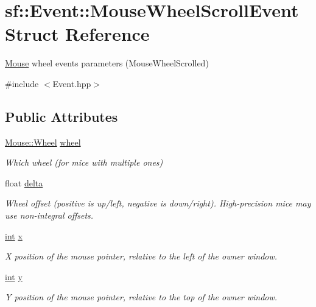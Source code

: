 \hypertarget{structsf_1_1_event_1_1_mouse_wheel_scroll_event}{\section{sf\-:\-:Event\-:\-:Mouse\-Wheel\-Scroll\-Event Struct Reference}
\label{structsf_1_1_event_1_1_mouse_wheel_scroll_event}
}


\hyperlink{classsf_1_1_mouse}{Mouse} wheel events parameters (Mouse\-Wheel\-Scrolled)  




{\ttfamily \#include $<$Event.\-hpp$>$}

\subsection*{Public Attributes}
\begin{DoxyCompactItemize}
\item 
\hyperlink{classsf_1_1_mouse_a60dd479a43f26f200e7957aa11803ff4}{Mouse\-::\-Wheel} \hyperlink{structsf_1_1_event_1_1_mouse_wheel_scroll_event_a1d82dccecc46968d517b2fc66639dd74}{wheel}
\begin{DoxyCompactList}\small\item\em Which wheel (for mice with multiple ones) \end{DoxyCompactList}\item 
float \hyperlink{structsf_1_1_event_1_1_mouse_wheel_scroll_event_ac45c164997a594d424071e74b53b5817}{delta}
\begin{DoxyCompactList}\small\item\em Wheel offset (positive is up/left, negative is down/right). High-\/precision mice may use non-\/integral offsets. \end{DoxyCompactList}\item 
\hyperlink{term__entry_8h_ad65b480f8c8270356b45a9890f6499ae}{int} \hyperlink{structsf_1_1_event_1_1_mouse_wheel_scroll_event_a3d17cae0568d18083f879655abdc8ae4}{x}
\begin{DoxyCompactList}\small\item\em X position of the mouse pointer, relative to the left of the owner window. \end{DoxyCompactList}\item 
\hyperlink{term__entry_8h_ad65b480f8c8270356b45a9890f6499ae}{int} \hyperlink{structsf_1_1_event_1_1_mouse_wheel_scroll_event_aa38bf23704162024eed19917eef3853c}{y}
\begin{DoxyCompactList}\small\item\em Y position of the mouse pointer, relative to the top of the owner window. \end{DoxyCompactList}\end{DoxyCompactItemize}


